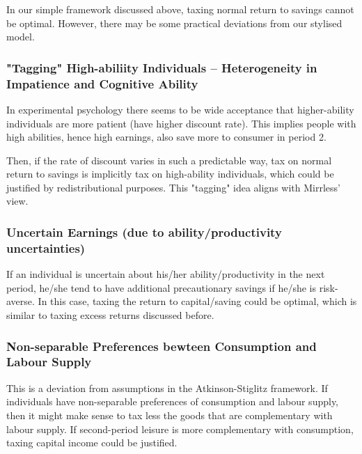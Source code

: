         In our simple framework discussed above, taxing normal return to savings cannot be optimal. However, there may be some practical deviations from our stylised model.

        \subsubsection{"Tagging" High-abiliity Individuals -- Heterogeneity in Impatience and Cognitive Ability}

            In experimental psychology there seems to be wide acceptance that higher-ability individuals are more patient (have higher discount rate). This implies people with high abilities, hence high earnings, also save more to consumer in period 2.

            Then, if the rate of discount varies in such a predictable way, tax on normal return to savings is implicitly tax on high-ability individuals, which could be justified by redistributional purposes. This "tagging" idea aligns with Mirrless' view.

        \subsubsection{Uncertain Earnings (due to ability/productivity uncertainties)}

            If an individual is uncertain about his/her ability/productivity in the next period, he/she tend to have additional precautionary savings if he/she is risk-averse. In this case, taxing the return to capital/saving could be optimal, which is similar to taxing excess returns discussed before.

        \subsubsection{Non-separable Preferences bewteen Consumption and Labour Supply}\label{subsubsec:non_separable_pref}

            This is a deviation from assumptions in the Atkinson-Stiglitz framework. If individuals have non-separable preferences of consumption and labour supply, then it might make sense to tax less the goods that are complementary with labour supply. If second-period leisure is more complementary with consumption, taxing capital income could be justified.